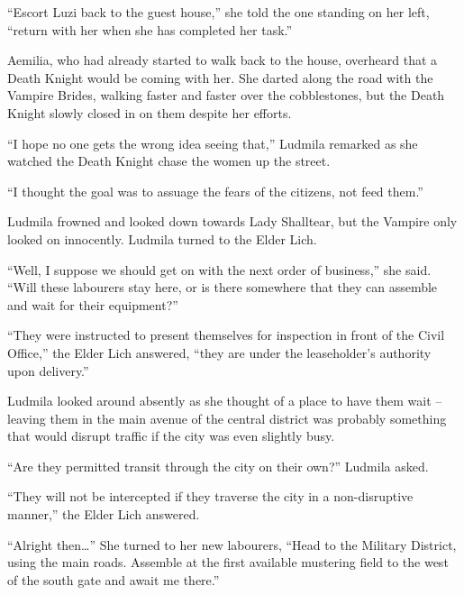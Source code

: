 “Escort Luzi back to the guest house,” she told the one standing on her left, “return with her when she has completed her task.”

 

Aemilia, who had already started to walk back to the house, overheard that a Death Knight would be coming with her. She darted along the road with the Vampire Brides, walking faster and faster over the cobblestones, but the Death Knight slowly closed in on them despite her efforts.

 

“I hope no one gets the wrong idea seeing that,” Ludmila remarked as she watched the Death Knight chase the women up the street.

 

“I thought the goal was to assuage the fears of the citizens, not feed them.”

 

Ludmila frowned and looked down towards Lady Shalltear, but the Vampire only looked on innocently. Ludmila turned to the Elder Lich.

 

“Well, I suppose we should get on with the next order of business,” she said. “Will these labourers stay here, or is there somewhere that they can assemble and wait for their equipment?”

 

“They were instructed to present themselves for inspection in front of the Civil Office,” the Elder Lich answered, “they are under the leaseholder’s authority upon delivery.”

 

Ludmila looked around absently as she thought of a place to have them wait – leaving them in the main avenue of the central district was probably something that would disrupt traffic if the city was even slightly busy.

 

“Are they permitted transit through the city on their own?” Ludmila asked.

 

“They will not be intercepted if they traverse the city in a non-disruptive manner,” the Elder Lich answered.

 

“Alright then…” She turned to her new labourers, “Head to the Military District, using the main roads. Assemble at the first available mustering field to the west of the south gate and await me there.”

